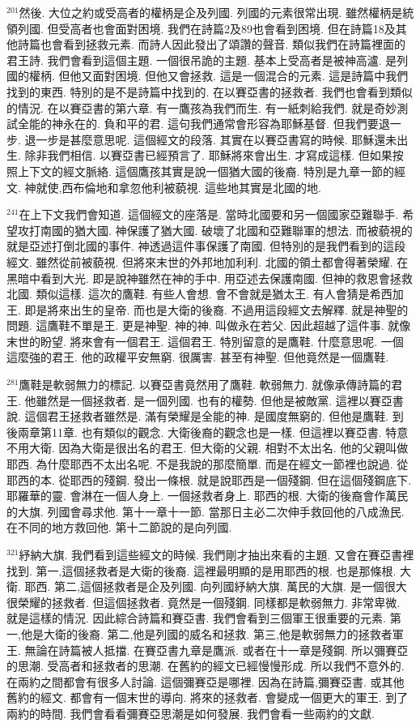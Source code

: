 \documentclass{book}
\begin{document}
$^{201}$然後.
大位之約或受高者的權柄是企及列國.
列國的元素很常出現.
雖然權柄是統領列國.
但受高者也會面對困境.
我們在詩篇2及89也會看到困境.
但在詩篇18及其他詩篇也會看到拯救元素.
而詩人因此發出了頌讚的聲音.
類似我們在詩篇裡面的君王詩.
我們會看到這個主題.
一個很吊詭的主題.
基本上受高者是被神高瀘.
是列國的權柄.
但他又面對困境.
但他又會拯救.
這是一個混合的元素.
這是詩篇中我們找到的東西.
特別的是不是詩篇中找到的.
在以賽亞書的拯救者.
我們也會看到類似的情況.
在以賽亞書的第六章.
有一鷹孩為我們而生.
有一紙刺給我們.
就是奇妙測試全能的神永在的.
負和平的君.
這句我們通常會形容為耶穌基督.
但我們要退一步.
退一步是甚麼意思呢.
這個經文的段落.
其實在以賽亞書寫的時候.
耶穌還未出生.
除非我們相信.
以賽亞書已經預言了.
耶穌將來會出生.
才寫成這樣.
但如果按照上下文的經文脈絡.
這個鷹孩其實是說一個猶大國的後裔.
特別是九章一節的經文.
神就使,西布倫地和拿忽他利被藐視.
這些地其實是北國的地.

$^{241}$在上下文我們會知道.
這個經文的座落是.
當時北國要和另一個國家亞難聯手.
希望攻打南國的猶大國.
神保護了猶大國.
破壞了北國和亞難聯軍的想法.
而被藐視的就是亞述打倒北國的事件.
神透過這件事保護了南國.
但特別的是我們看到的這段經文.
雖然從前被藐視.
但將來末世的外邦地加利利.
北國的領土都會得著榮耀.
在黑暗中看到大光.
即是說神雖然在神的手中.
用亞述去保護南國.
但神的救恩會拯救北國.
類似這樣.
這次的鷹鞋.
有些人會想.
會不會就是猶太王.
有人會猜是希西加王.
即是將來出生的皇帝.
而也是大衛的後裔.
不過用這段經文去解釋.
就是神聖的問題.
這鷹鞋不單是王.
更是神聖.
神的神.
叫做永在若父.
因此超越了這件事.
就像末世的盼望.
將來會有一個君王.
這個君王.
特別留意的是鷹鞋.
什麼意思呢.
一個這麼強的君王.
他的政權平安無窮.
很厲害.
甚至有神聖.
但他竟然是一個鷹鞋.

$^{281}$鷹鞋是軟弱無力的標記.
以賽亞書竟然用了鷹鞋.
軟弱無力.
就像承傳詩篇的君王.
他雖然是一個拯救者.
是一個列國.
也有的權勢.
但他是被敵黨.
這裡以賽亞書說.
這個君王拯救者雖然是.
滿有榮耀是全能的神.
是國度無窮的.
但他是鷹鞋.
到後兩章第11章.
也有類似的觀念.
大衛後裔的觀念也是一樣.
但這裡以賽亞書.
特意不用大衛.
因為大衛是很出名的君王.
但大衛的父親.
相對不太出名.
他的父親叫做耶西.
為什麼耶西不太出名呢.
不是我說的那麼簡單.
而是在經文一節裡也說過.
從耶西的本.
從耶西的殘鋼.
發出一條根.
就是說耶西是一個殘鋼.
但在這個殘鋼底下.
耶羅華的靈.
會淋在一個人身上.
一個拯救者身上.
耶西的根.
大衛的後裔會作萬民的大旗.
列國會尋求他.
第十一章十一節.
當那日主必二次伸手救回他的八成漁民.
在不同的地方救回他.
第十二節說的是向列國.

$^{321}$紓納大旗.
我們看到這些經文的時候.
我們剛才抽出來看的主題.
又會在賽亞書裡找到.
第一,這個拯救者是大衛的後裔.
這裡最明顯的是用耶西的根.
也是那條根.
大衛.
耶西.
第二,這個拯救者是企及列國.
向列國紓納大旗.
萬民的大旗.
是一個很大很榮耀的拯救者.
但這個拯救者.
竟然是一個殘鋼.
同樣都是軟弱無力.
非常卑微.
就是這樣的情況.
因此綜合詩篇和賽亞書.
我們會看到三個軍王很重要的元素.
第一,他是大衛的後裔.
第二,他是列國的威名和拯救.
第三,他是軟弱無力的拯救者軍王.
無論在詩篇被人抵擋.
在賽亞書九章是鷹派.
或者在十一章是殘鋼.
所以彌賽亞的思潮.
受高者和拯救者的思潮.
在舊約的經文已經慢慢形成.
所以我們不意外的.
在兩約之間都會有很多人討論.
這個彌賽亞是哪裡.
因為在詩篇,彌賽亞書.
或其他舊約的經文.
都會有一個末世的導向.
將來的拯救者.
會變成一個更大的軍王.
到了兩約的時間.
我們會看看彌賽亞思潮是如何發展.
我們會看一些兩約的文獻.
\end{document}
